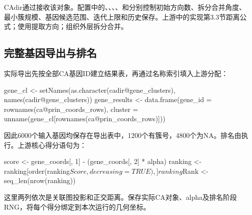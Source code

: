 CAdir通过\texttt{\fontsize{10}{12}\selectfont{}}接收该对象。配置中的\texttt{\fontsize{10}{12}\selectfont{}}、\texttt{\fontsize{10}{12}\selectfont{}}、\texttt{\fontsize{10}{12}\selectfont{}}、\texttt{\fontsize{10}{12}\selectfont{}}、\texttt{\fontsize{10}{12}\selectfont{}}和\texttt{\fontsize{10}{12}\selectfont{}}分别控制初始方向数、拆分合并角度、最小簇规模、基因候选范围、迭代上限和历史保存。上游\texttt{\fontsize{10}{12}\selectfont{}}中的\texttt{\fontsize{10}{12}\selectfont{}}实现第\allowbreak{}3.3节距离公式；\texttt{\fontsize{10}{12}\selectfont{}}使用\texttt{\fontsize{10}{12}\selectfont{}}提取方向；\texttt{\fontsize{10}{12}\selectfont{}}组织外层拆分合并。

\subsection{完整基因导出与排名}
实际导出先按全部CA基因ID建立结果表，再通过名称索引填入上游分配：

\begin{ReportCode}
gene_cl <- setNames(as.character(cadir@gene_clusters), names(cadir@gene_clusters))
gene_results <- data.frame(gene_id = rownames(ca@prin_coords_rows),
  cluster = unname(gene_cl[rownames(ca@prin_coords_rows)]))
\end{ReportCode}

因此\allowbreak{}6000个输入基因均保存在导出表中，1200个有簇号，4800个为NA。排名由\texttt{\fontsize{10}{12}\selectfont{}}执行。上游核心得分语句为：

\begin{ReportCode}
score <- gene_coords[, 1] - (gene_coords[, 2] * alpha)
ranking <- ranking[order(ranking$Score, decreasing = TRUE), ]
ranking$Rank <- seq_len(nrow(ranking))
\end{ReportCode}

这里两列\texttt{\fontsize{10}{12}\selectfont{}}依次是关联图投影和正交距离。保存实际CA对象、alpha及排名阶段RNG，将每个得分绑定到本次运行的几何坐标。

